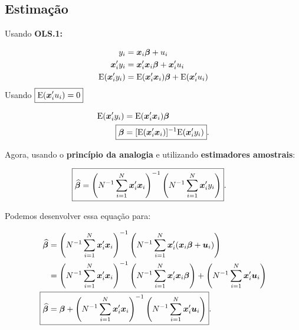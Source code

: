 \documentclass[11pt, oneside, a4paper, article]{article}
\numberwithin{equation}{section}
\begin{document}
\subsection{Estimação} 

Usando \textbf{OLS.1:}

\vspace{-1.5 em}
\begin{align*}
y_{i} &= \boldsymbol{x}_{i} \boldsymbol{\beta} + u_{i} 
\\
\boldsymbol{x}_{i}' y_{i} &= \boldsymbol{x}_{i}' \boldsymbol{x}_{i} \boldsymbol{\beta} + \boldsymbol{x}_{i}' u_{i} 
\\
\text{E}( \boldsymbol{x}_{i}' y_{i}) &= \text{E}( \boldsymbol{x}_{i}' \boldsymbol{x}_{i} ) \boldsymbol{\beta} + \text{E}( \boldsymbol{x}_{i}' u_{i} ) 
\end{align*}
Usando $\boxed{\text{E}( \boldsymbol{x}_{i}' u_{i} ) = 0}$ 

\vspace{-1 em}
\begin{align}
\notag
\E( \xvec_{i}' y_{i}) &= \E( \xvec_{i}' \xvec_{i} ) \betavec
\\
\label{ols:beta}
\Aboxed{\betavec &= [\E( \xvec_{i}' \xvec_{i} )]^{-1} \E( \xvec_{i}' y_{i}) }.
\end{align}

Agora, usando o \textbf{princípio da analogia} e utilizando \textbf{estimadores amostrais}:

\vspace{-1 em}
\begin{align}\label{ols:betahat:sums}
	\Aboxed{
\betahatbold &= 
\left( N^{-1} \sum_{i=1}^{N} \mbs{x}_{i}' \mbs{x}_{i} \right)^{-1}
\left( N^{-1} \sum_{i=1}^{N} \mbs{x}_{i}' y_{i} \right) }.
\end{align}

Podemos desenvolver essa equação para:

\vspace{-1 em}
\begin{align}
	\notag
\betahatbold &= 
\left( N^{-1} \sum_{i=1}^{N} \mbs{x}_{i}' \mbs{x}_{i} \right)^{-1}
\left( N^{-1} \sum_{i=1}^{N} \mbs{x}_{i}' (\mbs{x}_{i} \mbs{\beta} + \mbs{u}_{i}) \right)
\\
	\notag
&=
\left( N^{-1} \sum_{i=1}^{N} \mbs{x}_{i}' \mbs{x}_{i} \right)^{-1}
\left( N^{-1} \sum_{i=1}^{N} \mbs{x}_{i}' \mbs{x}_{i} \mbs{\beta} \right) +
\left( N^{-1} \sum_{i=1}^{N} \mbs{x}_{i}' \mbs{u}_{i} \right)
\\
\label{ols:betahat:u}
\Aboxed{
\betahatbold &= 
\betavec +
\left( N^{-1} \sum_{i=1}^{N} \mbs{x}_{i}' \mbs{x}_{i} \right)^{-1}
\left( N^{-1} \sum_{i=1}^{N} \mbs{x}_{i}' \mbs{u}_{i} \right) }.
\end{align}
\end{document}
